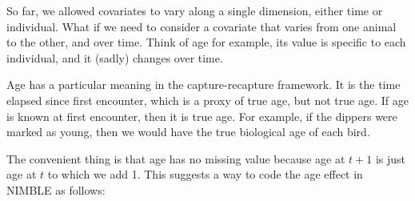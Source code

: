 \documentclass[
  12pt,
]{krantz}
\begin{document}
So far, we allowed covariates to vary along a single dimension, either time or individual. What if we need to consider a covariate that varies from one animal to the other, and over time. Think of age for example, its value is specific to each individual, and it (sadly) changes over time.

Age has a particular meaning in the capture-recapture framework. It is the time elapsed since first encounter, which is a proxy of true age, but not true age. If age is known at first encounter, then it is true age. For example, if the dippers were marked as young, then we would have the true biological age of each bird.

The convenient thing is that age has no missing value because age at \(t+1\) is just age at \(t\) to which we add 1. This suggests a way to code the age effect in NIMBLE as follows:
\end{document}
